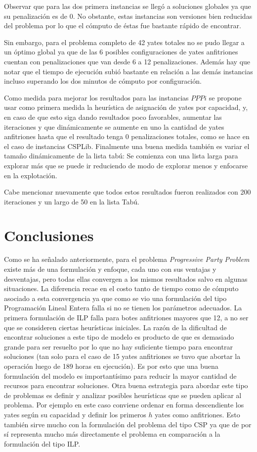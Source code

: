 \documentclass[letter, 10pt]{article}
\begin{document}
Observar que para las dos primera instancias se llegó a soluciones globales ya que su penalización es de 0. No obstante, estas instancias son versiones bien reducidas del problema por lo que el cómputo de éstas fue bastante rápido de encontrar.

Sin embargo, para el problema completo de 42 yates totales no se pudo llegar a un óptimo global ya que de las 6 posibles configuraciones de yates anfitriones cuentan con penalizaciones que van desde 6 a 12 penalizaciones. Además hay que notar que el tiempo de ejecución subió bastante en relación a las demás instancias incluso superando los dos minutos de cómputo por configuración.

Como medida para mejorar los resultados para las instancias $PPPi$ se propone usar como primera medida la heurística de asignación de yates por capacidad, y, en caso de que esto siga dando resultados poco favorables, aumentar las iteraciones y que dinámicamente se aumente en uno la cantidad de yates anfitriones hasta que el resultado tenga 0 penalizaciones totales, como se hace en el caso de instancias CSPLib. Finalmente una buena medida también es variar el tamaño dinámicamente de la lista tabú: Se comienza con una lista larga para explorar más que se puede ir reduciendo de modo de explorar menos y enfocarse en la explotación.

Cabe mencionar nuevamente que todos estos resultados fueron realizados con 200 iteraciones y un largo de 50 en la lista Tabú. 

\section{Conclusiones}

Como se ha señalado anteriormente, para el problema \textit{Progressive Party Problem} existe más de una formulación y enfoque, cada uno con sus ventajas y desventajas, pero todas ellas convergen a los mismos resultados salvo en algunas situaciones. La diferencia recae en el costo tanto de tiempo como de cómputo asociado a esta convergencia ya que como se vio una formulación del tipo Programación Lineal Entera falla si no se tienen los parámetros adecuados. La primera formulación de ILP falla para botes anfitriones mayores que 12, a no ser que se consideren ciertas heurísticas iniciales. La razón de la dificultad de encontrar soluciones a este tipo de modelo es producto de que es demasiado grande para ser resuelto por lo que no hay suficiente tiempo para encontrar soluciones (tan solo para el caso de 15 yates anfitriones se tuvo que abortar la operación luego de 189 horas en ejecución\cite{Smith1996}). Es por esto que una buena formulación del modelo es importantísimo para reducir la mayor cantidad de recursos para encontrar soluciones. Otra buena estrategia para abordar este tipo de problemas es definir y analizar posibles heurísticas que se pueden aplicar al problema. Por ejemplo en este caso conviene ordenar en forma descendiente los yates según su capacidad y definir los primeros $h$ yates como anfitriones. Esto también sirve mucho con la formulación del problema del tipo CSP ya que de por sí representa mucho más directamente el problema en comparación a la formulación del tipo ILP.
\end{document}
